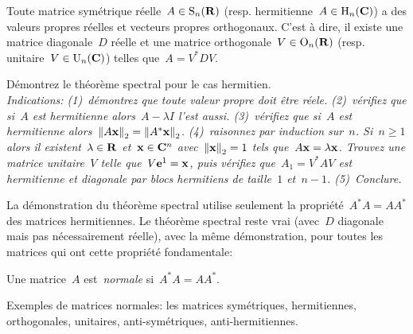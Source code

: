 \begin{proposition}
	Toute matrice symétrique réelle~$A\in\mathrm{S}_n(\mathbf{R})$ (resp. hermitienne~$A\in
	\mathrm{H}_n(\mathbf{C})$) a des valeurs propres réelles et vecteurs propres orthogonaux.
	C'est à dire, il existe une matrice diagonale~$D$ réelle et une matrice
	orthogonale~$V\in\mathrm{O}_n(\mathbf{R})$ (resp.  unitaire~$V\in\mathrm{U}_n(\mathbf{C})$) telles
	que~$A=V^* D V$.
\end{proposition}

\begin{exercice}
	Démontrez le théorème spectral pour le cas hermitien.\\
	\emph{
	Indications: (1)~démontrez que toute valeur propre doit être réele.
	(2)\!~vérifiez que si~$A$ est hermitienne alors~$A-\lambda I$ l'est aussi.
	(3)\!~vérifiez que si~$A$ est hermitienne
	alors~$\left\|A\mathbf{x}\right\|_2=\left\|A^*\mathbf{x}\right\|_2$.
	(4)\!~raisonnez par induction sur~$n$.  Si~$n\ge 1$ alors il
	existent~$\lambda\in\mathbf{R}$ et~$\mathbf{x}\in\mathbf{C}^n$ avec~$\left\|\mathbf{x}\right\|_2=1$ tels
	que~$A\mathbf{x}=\lambda\mathbf{x}$.  Trouvez une matrice unitaire~$V$ telle
	que~$V\mathbf{e}^1=\mathbf{x}$, puis vérifiez que~$A_1=V^*AV$ est hermitienne et diagonale
	par blocs hermitiens de taille~$1$ et~$n-1$.
	(5)\!\!~Conclure.
}
\end{exercice}

La démonstration du théorème spectral utilise seulement la
propriété~$A^*A=AA^*$ des matrices hermitiennes.  Le théorème spectral reste
vrai (avec~$D$ diagonale mais pas nécessairement réelle), avec la même démonstration, pour toutes les matrices qui ont cette
propriété fondamentale:

\begin{definition}
	Une matrice~$A$ est~\emph{normale} si~$A^*A=AA^*$.
\end{definition}

Exemples de matrices normales: les matrices symétriques,
hermitiennes, orthogonales, unitaires, anti-symétriques, anti-hermitiennes.




%


